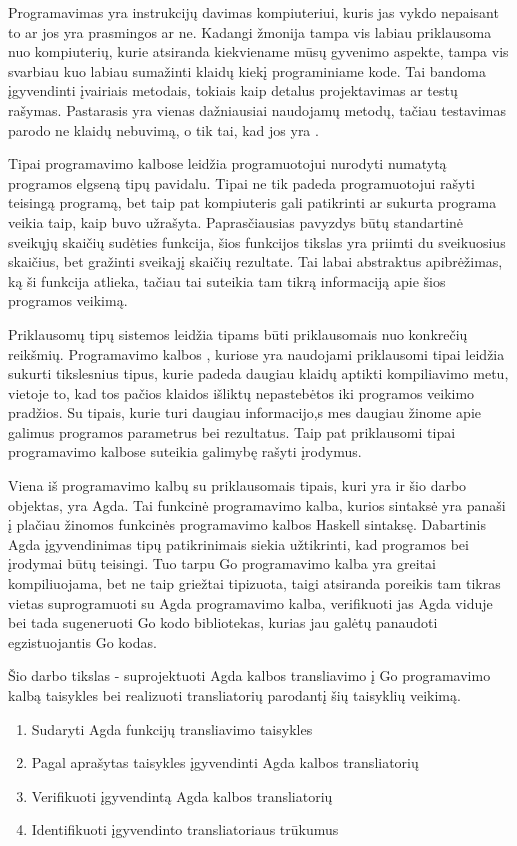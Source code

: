 \documentclass{VUMIFPSbakalaurinis}
\begin{document}
\tableofcontents


Programavimas yra instrukcijų davimas kompiuteriui, kuris jas vykdo nepaisant to ar jos yra prasmingos ar ne. Kadangi žmonija tampa vis labiau priklausoma nuo kompiuterių, kurie atsiranda kiekviename mūsų gyvenimo aspekte, tampa vis svarbiau kuo labiau sumažinti klaidų kiekį programiniame kode. Tai bandoma įgyvendinti įvairiais metodais, tokiais kaip detalus projektavimas ar testų rašymas. Pastarasis yra vienas dažniausiai naudojamų metodų, tačiau testavimas parodo ne klaidų nebuvimą, o tik tai, kad jos yra \cite{UHC}.
\par Tipai programavimo kalbose leidžia programuotojui nurodyti numatytą programos elgseną tipų pavidalu. Tipai ne tik padeda programuotojui rašyti teisingą programą, bet taip pat kompiuteris gali patikrinti ar sukurta programa veikia taip, kaip buvo užrašyta. Paprasčiausias pavyzdys būtų standartinė sveikųjų skaičių sudėties funkcija, šios funkcijos tikslas yra priimti  du sveikuosius skaičius, bet gražinti sveikajį skaičių rezultate. Tai labai abstraktus apibrėžimas, ką ši funkcija atlieka, tačiau tai suteikia tam tikrą informaciją apie šios programos veikimą.\par
Priklausomų tipų sistemos \cite{schematicApproach} leidžia tipams būti priklausomais nuo konkrečių reikšmių. Programavimo kalbos \cite{agda_book,idris}, kuriose yra naudojami priklausomi tipai leidžia sukurti tikslesnius tipus, kurie padeda daugiau klaidų aptikti kompiliavimo metu, vietoje to, kad tos pačios klaidos išliktų nepastebėtos iki programos veikimo pradžios. Su tipais, kurie turi daugiau informacijo,s mes daugiau žinome apie galimus programos parametrus bei rezultatus. Taip pat priklausomi tipai programavimo kalbose suteikia galimybę rašyti įrodymus.
\par Viena iš programavimo kalbų su priklausomais tipais, kuri yra ir šio darbo objektas, yra Agda. Tai funkcinė programavimo kalba, kurios sintaksė yra panaši į plačiau žinomos funkcinės programavimo kalbos Haskell \cite{haskell} sintaksę. Dabartinis Agda įgyvendinimas tipų patikrinimais siekia užtikrinti, kad programos bei įrodymai būtų teisingi. Tuo tarpu Go programavimo kalba \cite{Go} yra greitai kompiliuojama, bet ne taip griežtai tipizuota, taigi atsiranda poreikis tam tikras vietas suprogramuoti su Agda programavimo kalba, verifikuoti jas Agda viduje bei tada sugeneruoti Go kodo bibliotekas, kurias jau galėtų panaudoti egzistuojantis Go kodas.\par Šio darbo tikslas - suprojektuoti Agda kalbos transliavimo į Go programavimo kalbą taisykles bei realizuoti transliatorių parodantį šių taisyklių veikimą.
\begin{enumerate}[noitemsep]
	\item Sudaryti Agda funkcijų transliavimo taisykles
	\item Pagal aprašytas taisykles įgyvendinti Agda kalbos transliatorių
	\item Verifikuoti įgyvendintą Agda kalbos transliatorių
	\item Identifikuoti įgyvendinto transliatoriaus trūkumus 
\end{enumerate}
\end{document}
